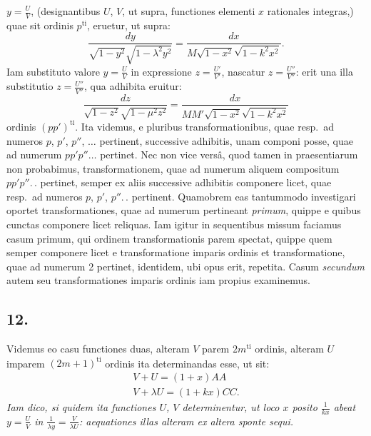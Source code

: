 \documentclass{article}
\begin{document}
$y=\frac{U}{V}$, (designantibus $U$, $V$, ut supra, functiones elementi $x$ rationales integras,) quae sit ordinis $p^{\mathrm{ti}}$, eruetur, ut supra:
\[
\frac{dy}{\sqrt{1-y^{2}}\sqrt{1-\lambda^{2}y^{2}}}=\frac{dx}{M\sqrt{1-x^{2}}\sqrt{1-k^{2}x^{2}}}.
\]
Iam substituto valore $y=\frac{U}{V}$ in expressione $z=\frac{U'}{V'}$, nascatur $z=\frac{U''}{V''}$: erit una illa substitutio $z=\frac{U''}{V''}$, qua adhibita eruitur:
\[
\frac{dz}{\sqrt{1-z^{2}}\sqrt{1-\mu^{2}z^{2}}}=\frac{dx}{MM'\sqrt{1-x^{2}}\sqrt{1-k^{2}x^{2}}}
\]
ordinis $(pp')^{\mathrm{ti}}$. Ita videmus, e pluribus transformationibus, quae resp.\ ad numeros $p$, $p'$, $p''$, $\ldots$ pertinent, successive adhibitis, unam componi posse, quae ad numerum $pp'p''\ldots$ pertinet. Nec non vice versâ, quod tamen in praesentiarum non probabimus, transformationem, quae ad numerum aliquem compositum $pp'p''.\,.$ pertinet, semper ex aliis successive adhibitis componere licet, quae resp.\ ad numeros $p$, $p'$, $p''.\,.$ pertinent. Quamobrem eas tantummodo investigari oportet transformationes, quae ad numerum pertineant \emph{primum}, quippe e quibus cunctas componere licet reliquas. Iam igitur in sequentibus missum faciamus casum primum, qui ordinem transformationis parem spectat, quippe quem semper componere licet e transformatione imparis ordinis et transformatione, quae ad numerum 2 pertinet, identidem, ubi opus erit, repetita. Casum \emph{secundum} autem seu transformationes imparis ordinis iam propius examinemus.

\subsection*{12.}

Videmus eo casu functiones duas, alteram $V$ parem $2m^{\mathrm{ti}}$ ordinis, alteram $U$ imparem $(2m+1)^{\mathrm{ti}}$ ordinis ita determinandas esse, ut sit:
\[
\begin{gathered}
V+U=(1+x)AA\\
V+\lambda U=(1+kx)CC.
\end{gathered}
\]
\emph{Iam dico, si quidem ita functiones $U$, $V$ determinentur, ut loco $x$ posito $\frac{1}{kx}$ abeat $y=\frac{U}{V}$ in $\frac{1}{\lambda y}=\frac{V}{\lambda U}$: aequationes illas alteram ex altera sponte sequi.}

\end{document}
